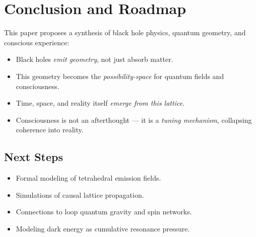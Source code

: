 \documentclass[12pt]{article}
\begin{document}
\section{Conclusion and Roadmap}
This paper proposes a synthesis of black hole physics, quantum geometry, and conscious experience:

\begin{itemize}[noitemsep,topsep=0.5em]
\item Black holes \emph{emit geometry}, not just absorb matter.
\item This geometry becomes the \emph{possibility-space} for quantum fields and consciousness.
\item Time, space, and reality itself \emph{emerge from this lattice}.
\item Consciousness is not an afterthought — it is a \emph{tuning mechanism}, collapsing coherence into reality.
\end{itemize}

\subsection*{Next Steps}
\begin{itemize}[noitemsep,topsep=0.5em]
\item Formal modeling of tetrahedral emission fields.
\item Simulations of causal lattice propagation.
\item Connections to loop quantum gravity and spin networks.
\item Modeling dark energy as cumulative resonance pressure.
\end{itemize}

\end{document}
